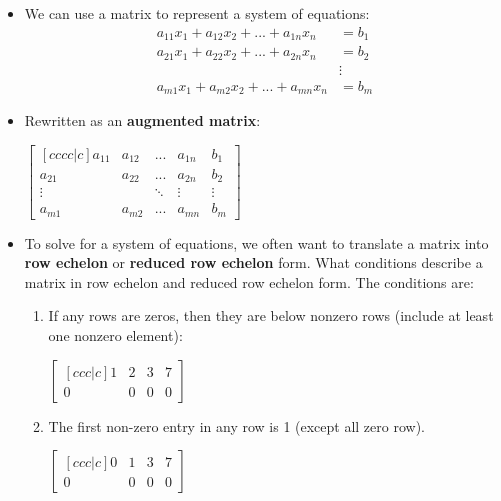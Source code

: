 \begin{itemize}
    \item We can use a matrix to represent a system of equations:
    \begin{align*}
        a_{11}x_1 + a_{12}x_2 + ... + a_{1n}x_n & = b_1 \\
        a_{21}x_1 + a_{22}x_2 + ... + a_{2n}x_n & = b_2 \\
                                                & \vdots \\
        a_{m1}x_1 + a_{m2}x_2 + ... + a_{mn}x_n & = b_m 
    \end{align*}    
    \item Rewritten as an \textbf{augmented matrix}:
    
    \begin{center}
    $\begin{bmatrix}[cccc|c]
        a_{11} & a_{12} & ... & a_{1n} & b_1 \\
        a_{21} & a_{22} & ... & a_{2n} & b_2 \\
        \vdots &        & \ddots & \vdots & \vdots \\
        a_{m1} & a_{m2} & ... & a_{mn} & b_m
    \end{bmatrix}$
    \end{center} 

    \item To solve for a system of equations, we often want to translate a matrix into \textbf{row echelon} or \textbf{reduced row echelon} form.  What conditions describe a matrix in row echelon and reduced row echelon form. The conditions are:
    \begin{enumerate}
        \item If any rows are zeros, then they are below nonzero rows (include at least one nonzero element): 
            
        $\begin{bmatrix}[ccc|c]
            1 & 2 & 3 & 7 \\
            0 & 0 & 0 & 0 
        \end{bmatrix}$
        
        \item The first non-zero entry in any row is 1 (except all zero row).
            
        $\begin{bmatrix}[ccc|c]
            0 & 1 & 3 & 7 \\
            0 & 0 & 0 & 0 
        \end{bmatrix}$
            

\end{enumerate}
\end{itemize}
